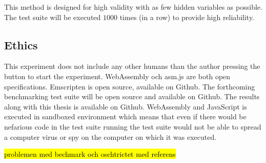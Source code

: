 This method is designed for high validity with as few hidden variables as possible. The test suite will be executed $1 000$ times (in a row) to provide high reliability.

\subsection{Ethics}

This experiment does not include any other humans than the author pressing the button to start the experiment. WebAssembly och asm.js are both open specifications. Emscripten is open source, available on Github. The forthcoming benchmarking test suite will be open source and available on Github. The results along with this thesis is available on Github. WebAssembly and JavaScript is executed in sandboxed environment which means that even if there would be nefarious code in the test suite running the test suite would not be able to spread a computer virus or spy on the computer on which it was executed.

\hl{problemen med bechmark och oschtrictet med referens}

